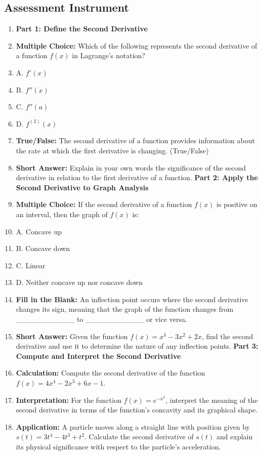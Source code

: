 \subsection{Assessment Instrument}

\begin{enumerate}
    \item \textbf{Part 1: Define the Second Derivative}
    \item \textbf{Multiple Choice:} Which of the following represents the second derivative of a function $f(x)$ in Lagrange’s notation?
    \item A. $f'(x)$
    \item B. $f''(x)$
    \item C. $f''(a)$
    \item D. $f^{(2)}(x)$
    \item \textbf{True/False:} The second derivative of a function provides information about the rate at which the first derivative is changing. (True/False)
    \item \textbf{Short Answer:} Explain in your own words the significance of the second derivative in relation to the first derivative of a function. \textbf{Part 2: Apply the Second Derivative to Graph Analysis}
    \item \textbf{Multiple Choice:} If the second derivative of a function $f(x)$ is positive on an interval, then the graph of $f(x)$ is:
    \item A. Concave up
    \item B. Concave down
    \item C. Linear
    \item D. Neither concave up nor concave down
    \item \textbf{Fill in the Blank:} An inflection point occurs where the second derivative changes its sign, meaning that the graph of the function changes from ___________ to ___________ or vice versa.
    \item \textbf{Short Answer:} Given the function $f(x) = x^3 - 3x^2 + 2x$, find the second derivative and use it to determine the nature of any inflection points. \textbf{Part 3: Compute and Interpret the Second Derivative}
    \item \textbf{Calculation:} Compute the second derivative of the function $f(x) = 4x^4 - 2x^3 + 6x - 1$.
    \item \textbf{Interpretation:} For the function $f(x) = e^{-x^2}$, interpret the meaning of the second derivative in terms of the function's concavity and its graphical shape.
    \item \textbf{Application:} A particle moves along a straight line with position given by $s(t) = 3t^4 - 4t^3 + t^2$. Calculate the second derivative of $s(t)$ and explain its physical significance with respect to the particle's acceleration.
\end{enumerate}

